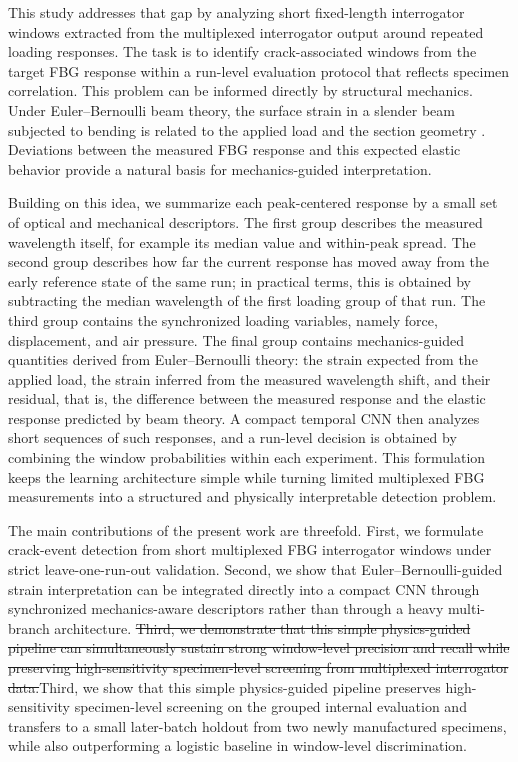 \documentclass[notspecified,article,submit,pdftex,moreauthors]{Definitions/mdpi}
\newcommand{\rev}[1]{{\color{red}#1}}
\newcommand{\revdel}[1]{{\color{red}\sout{#1}}}
\begin{document}
This study addresses that gap by analyzing short fixed-length interrogator windows extracted from the multiplexed interrogator output around repeated loading responses. The task is to identify crack-associated windows from the target FBG response within a run-level evaluation protocol that reflects specimen correlation. This problem can be informed directly by structural mechanics. Under Euler--Bernoulli beam theory, the surface strain in a slender beam subjected to bending is related to the applied load and the section geometry \cite{ochsner2021}. Deviations between the measured FBG response and this expected elastic behavior provide a natural basis for mechanics-guided interpretation.

Building on this idea, we summarize each peak-centered response by a small set of optical and mechanical descriptors. The first group describes the measured wavelength itself, for example its median value and within-peak spread. The second group describes how far the current response has moved away from the early reference state of the same run; in practical terms, this is obtained by subtracting the median wavelength of the first loading group of that run. The third group contains the synchronized loading variables, namely force, displacement, and air pressure. The final group contains mechanics-guided quantities derived from Euler--Bernoulli theory: the strain expected from the applied load, the strain inferred from the measured wavelength shift, and their residual, that is, the difference between the measured response and the elastic response predicted by beam theory. A compact temporal CNN then analyzes short sequences of such responses, and a run-level decision is obtained by combining the window probabilities within each experiment. This formulation keeps the learning architecture simple while turning limited multiplexed FBG measurements into a structured and physically interpretable detection problem.

The main contributions of the present work are threefold. First, we formulate crack-event detection from short multiplexed FBG interrogator windows under strict leave-one-run-out validation. Second, we show that Euler--Bernoulli-guided strain interpretation can be integrated directly into a compact CNN through synchronized mechanics-aware descriptors rather than through a heavy multi-branch architecture. \revdel{Third, we demonstrate that this simple physics-guided pipeline can simultaneously sustain strong window-level precision and recall while preserving high-sensitivity specimen-level screening from multiplexed interrogator data.}\rev{Third, we show that this simple physics-guided pipeline preserves high-sensitivity specimen-level screening on the grouped internal evaluation and transfers to a small later-batch holdout from two newly manufactured specimens, while also outperforming a logistic baseline in window-level discrimination.}
\end{document}
